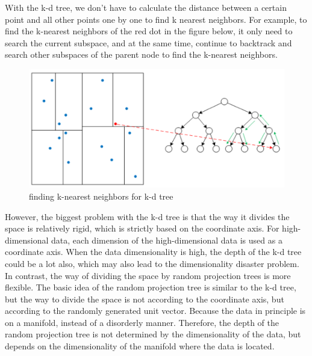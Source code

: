 \noindent With the k-d tree, we don't have to calculate the distance between a certain point and all other points one by one to find k nearest neighbors. For example, to find the k-nearest neighbors of the red dot in the figure below, it only need to search the current subspace, and at the same time, continue to backtrack and search other subspaces of the parent node to find the k-nearest neighbors.\\

\begin{figure}[ht]

\centering
\includegraphics[scale=0.85]{images/image_largevis_k-d_tree_2.PNG}
\caption{finding k-nearest neighbors for k-d tree}
\label{fig:label}
\end{figure}

\noindent However, the biggest problem with the k-d tree is that the way it divides the space is relatively rigid, which is strictly based on the coordinate axis. For high-dimensional data, each dimension of the high-dimensional data is used as a coordinate axis. When the data dimensionality is high, the depth of the k-d tree could be a lot also, which may also lead to the dimensionality disaster problem.\\

\noindent In contrast, the way of dividing the space by random projection trees is more flexible. The basic idea of the random projection tree is similar to the k-d tree, but the way to divide the space is not according to the coordinate axis, but according to the randomly generated unit vector. Because the data in principle is on a manifold, instead of a disorderly manner. Therefore, the depth of the random projection tree is not determined by the dimensionality of the data, but depends on the dimensionality of the manifold where the data is located\cite{ref6}.\\

